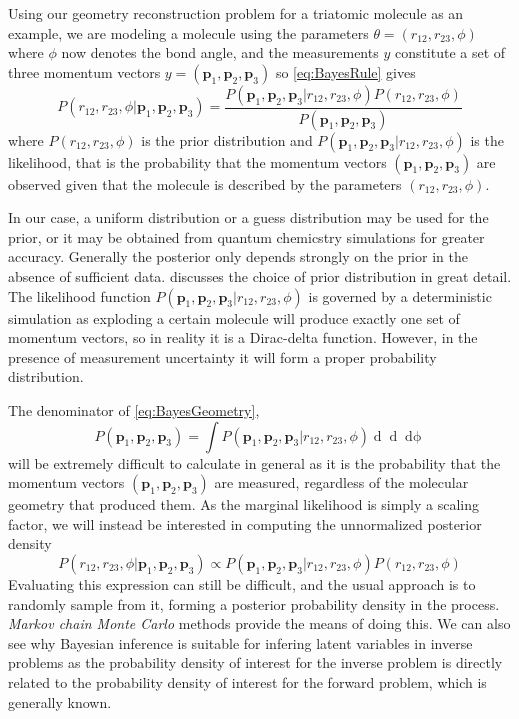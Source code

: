 Using our geometry reconstruction problem for a triatomic molecule as an example, we are modeling a molecule using the parameters $\theta = (r_{12}, r_{23}, \phi)$ where $\phi$ now denotes the bond angle, and the measurements $y$ constitute a set of three momentum vectors $y = (\mathbf{p}_1, \mathbf{p}_2, \mathbf{p}_3)$ so \eqref{eq:BayesRule} gives
\begin{equation} \label{eq:BayesGeometry}
  P(r_{12}, r_{23}, \phi|\mathbf{p}_1, \mathbf{p}_2, \mathbf{p}_3) = \frac{P(\mathbf{p}_1, \mathbf{p}_2, \mathbf{p}_3|r_{12}, r_{23}, \phi) P(r_{12}, r_{23}, \phi)}{P(\mathbf{p}_1, \mathbf{p}_2, \mathbf{p}_3)}
\end{equation}
where $P(r_{12}, r_{23}, \phi)$ is the prior distribution and $P(\mathbf{p}_1, \mathbf{p}_2, \mathbf{p}_3|r_{12}, r_{23}, \phi)$ is the likelihood, that is the probability that the momentum vectors $(\mathbf{p}_1, \mathbf{p}_2, \mathbf{p}_3)$ are observed given that the molecule is described by the parameters $(r_{12}, r_{23}, \phi)$.

In our case, a uniform distribution or a guess distribution may be used for the prior, or it may be obtained from quantum chemicstry simulations for greater accuracy. Generally the posterior only depends strongly on the prior in the absence of sufficient data. \citet{Gelman14} discusses the choice of prior distribution in great detail. The likelihood function $P(\mathbf{p}_1, \mathbf{p}_2, \mathbf{p}_3|r_{12}, r_{23}, \phi)$ is governed by a deterministic simulation as exploding a certain molecule will produce exactly one set of momentum vectors, so in reality it is a Dirac-delta function. However, in the presence of measurement uncertainty it will form a proper probability distribution.

The denominator of \eqref{eq:BayesGeometry},
\begin{equation}
  P(\mathbf{p}_1, \mathbf{p}_2, \mathbf{p}_3) =
    \int P(\mathbf{p}_1, \mathbf{p}_2, \mathbf{p}_3|r_{12}, r_{23}, \phi)
    \mathop{dr_{12}} \mathop{dr_{23}} \mathop{d\phi}
\end{equation}
will be extremely difficult to calculate in general as it is the probability that the momentum vectors $(\mathbf{p}_1, \mathbf{p}_2, \mathbf{p}_3)$ are measured, regardless of the molecular geometry that produced them. As the marginal likelihood is simply a scaling factor, we will instead be interested in computing the unnormalized posterior density
\begin{equation} 
  P(r_{12}, r_{23}, \phi|\mathbf{p}_1, \mathbf{p}_2, \mathbf{p}_3) \propto P(\mathbf{p}_1, \mathbf{p}_2, \mathbf{p}_3|r_{12}, r_{23}, \phi) P(r_{12}, r_{23}, \phi)
\end{equation}
Evaluating this expression can still be difficult, and the usual approach is to randomly sample from it, forming a posterior probability density in the process. \emph{Markov chain Monte Carlo} methods provide the means of doing this. We can also see why Bayesian inference is suitable for infering latent variables in inverse problems as the probability density of interest for the inverse problem is directly related to the probability density of interest for the forward problem, which is generally known.

